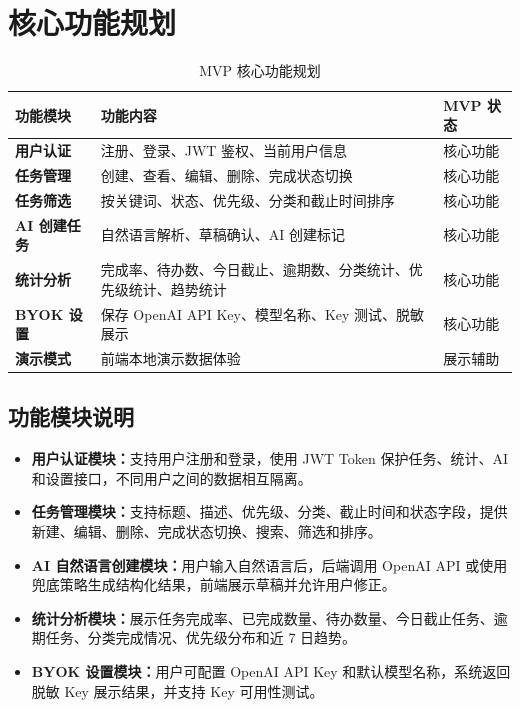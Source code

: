 \documentclass[UTF8,a4paper,12pt,fontset=fandol]{ctexart}
\begin{document}
\section{核心功能规划}

\begin{table}[H]
  \centering
  \caption{MVP 核心功能规划}
  \begin{tabularx}{\linewidth}{>{\bfseries}p{2.6cm}Yp{2.2cm}}
    \toprule
    功能模块 & 功能内容 & MVP 状态 \\
    \midrule
    用户认证 & 注册、登录、JWT 鉴权、当前用户信息 & 核心功能 \\
    任务管理 & 创建、查看、编辑、删除、完成状态切换 & 核心功能 \\
    任务筛选 & 按关键词、状态、优先级、分类和截止时间排序 & 核心功能 \\
    AI 创建任务 & 自然语言解析、草稿确认、AI 创建标记 & 核心功能 \\
    统计分析 & 完成率、待办数、今日截止、逾期数、分类统计、优先级统计、趋势统计 & 核心功能 \\
    BYOK 设置 & 保存 OpenAI API Key、模型名称、Key 测试、脱敏展示 & 核心功能 \\
    演示模式 & 前端本地演示数据体验 & 展示辅助 \\
    \bottomrule
  \end{tabularx}
\end{table}

\subsection{功能模块说明}

\begin{itemize}
  \item \textbf{用户认证模块：}支持用户注册和登录，使用 JWT Token 保护任务、统计、AI 和设置接口，不同用户之间的数据相互隔离。
  \item \textbf{任务管理模块：}支持标题、描述、优先级、分类、截止时间和状态字段，提供新建、编辑、删除、完成状态切换、搜索、筛选和排序。
  \item \textbf{AI 自然语言创建模块：}用户输入自然语言后，后端调用 OpenAI API 或使用兜底策略生成结构化结果，前端展示草稿并允许用户修正。
  \item \textbf{统计分析模块：}展示任务完成率、已完成数量、待办数量、今日截止任务、逾期任务、分类完成情况、优先级分布和近 7 日趋势。
  \item \textbf{BYOK 设置模块：}用户可配置 OpenAI API Key 和默认模型名称，系统返回脱敏 Key 展示结果，并支持 Key 可用性测试。
\end{itemize}
\end{document}
